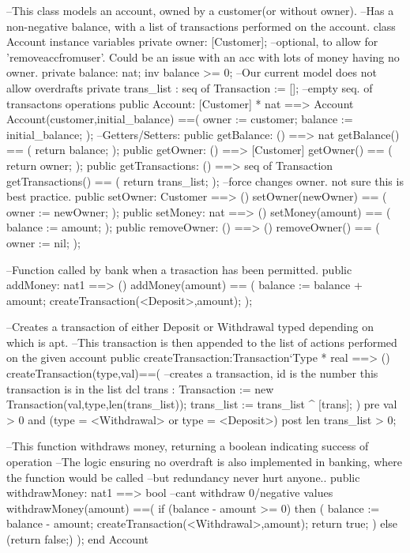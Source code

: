 \documentclass[a4paper]{article}
\begin{document}
\title{}
\author{}
\begin{vdm_al}
--This class models an account, owned by a customer(or without owner).
--Has a non-negative balance, with a list of transactions performed on the account. 
class Account
instance variables
    private owner: [Customer]; --optional, to allow for 'removeaccfromuser'. Could be an issue with an acc with lots of money having no owner. 
    private balance: nat;
    inv balance >= 0; --Our current model does not allow overdrafts
    private trans_list : seq of Transaction := []; --empty seq. of transactons
operations
    public Account: [Customer] * nat ==> Account
    Account(customer,initial_balance) ==(
        owner := customer;
        balance := initial_balance;
    );
    --Getters/Setters:
    public getBalance: () ==> nat
    getBalance() == (
        return balance;
    );
    public getOwner: () ==> [Customer]
    getOwner() == (
        return owner;
    );
    public getTransactions: () ==> seq of Transaction
    getTransactions() == (
        return trans_list;
    );
    --force changes owner. not sure this is best practice. 
    public setOwner: Customer ==> ()
    setOwner(newOwner) == (
        owner := newOwner;
    );
    public setMoney: nat ==> ()
    setMoney(amount) == (
        balance := amount;
    );
    public removeOwner: () ==> ()
    removeOwner() == (
        owner := nil;
    );

    --Function called by bank when a trasaction has been permitted. 
    public addMoney: nat1 ==> ()
    addMoney(amount) == (
        balance := balance + amount;
        createTransaction(<Deposit>,amount);
    );
    
    --Creates a transaction of either Deposit or Withdrawal typed depending on which is apt. 
    --This transaction is then appended to the list of actions performed on the given account
    public createTransaction:Transaction`Type * real ==> ()
    createTransaction(type,val)==(
        --creates a transaction, id is the number this transaction is in the list
        dcl trans : Transaction := new Transaction(val,type,len(trans_list));
        trans_list := trans_list ^ [trans];
    )
    pre val > 0 and (type = <Withdrawal> or type = <Deposit>)
    post len trans_list > 0;

    --This function withdraws money, returning a boolean indicating success of operation
    --The logic ensuring no overdraft is also implemented in banking, where the function would be called
    --but redundancy never hurt anyone..
    public withdrawMoney: nat1 ==> bool   --cant withdraw 0/negative values
    withdrawMoney(amount) ==(
        if (balance - amount >= 0) then (
            balance := balance - amount;
            createTransaction(<Withdrawal>,amount);
            return true;
        )
        else (return false;)
    );
end Account
\end{vdm_al}
\end{document}
